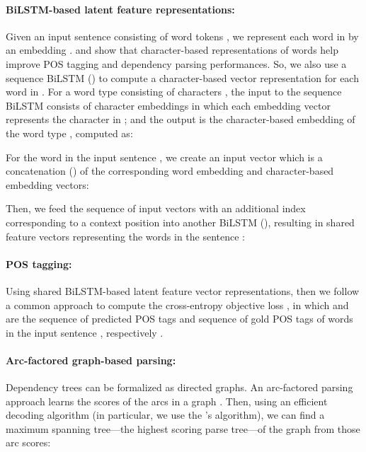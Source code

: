 \documentclass[11pt,letterpaper]{article}
\begin{document}
\paragraph{BiLSTM-based latent feature representations:} 
Given an input sentence  consisting of  word tokens , we represent each word  in  by an embedding .   \citet{plankP16} and \citet{ballesterosEMNLP} show that character-based  representations of words help improve POS tagging and dependency parsing performances. So, we also use a sequence BiLSTM () to compute a character-based  vector representation for each word  in . 
For a word type  consisting of  characters ,  the input to the sequence BiLSTM consists of  character embeddings  in which each embedding vector  represents the  character  in ; and  the output is the character-based embedding  of the word type ,  computed as:

\setlength{\abovedisplayskip}{-0pt}


For the  word  in the input sentence , we create an input vector  which is a  concatenation () of the corresponding word embedding and character-based embedding vectors:



Then, we feed the sequence of input vectors  with an additional index  corresponding to a context position  into another  BiLSTM (), resulting in shared  feature vectors  representing the  words  in the  sentence :



\paragraph{POS tagging:} Using shared BiLSTM-based latent feature vector representations, then we follow a common approach to compute the cross-entropy objective loss , in which  and  are the sequence of predicted POS tags and sequence of gold POS tags of words in the input sentence , respectively \citep{Goldberg16,plankP16}.


\paragraph{Arc-factored graph-based parsing:} Dependency trees can be formalized as directed graphs.  
An arc-factored parsing approach learns the scores of the arcs in a graph \citep{Kubler2009}. Then, using an efficient decoding algorithm (in particular, we use the \citet{Eisner:1996}'s   algorithm), we can find a maximum spanning tree---the highest scoring parse tree---of the graph from those arc scores:
\end{document}
